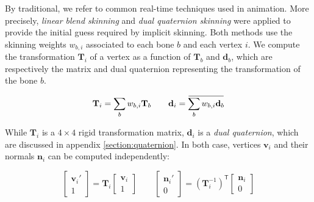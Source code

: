 \documentclass[a4paper,10pt]{article}
\newcommand{\overbar}[1]{\mkern 1.5mu\overline{\mkern-1.5mu#1\mkern-1.5mu}\mkern 1.5mu}
\begin{document}
\begin{multicols}{2}
By traditional, we refer to common real-time techniques used in animation.
More precisely, \emph{linear blend skinning} and \emph{dual quaternion skinning} \cite{Kavan:2008} were applied to provide the initial guess required by implicit skinning.
Both methods use the skinning weights $w_{b,i}$ associated to each bone $b$ and each vertex $i$.
We compute the transformation $\mathbf{T}_i$ of a vertex as a function of $\mathbf{T}_b$ and $\mathbf{d}_b$, which are respectively the matrix and dual quaternion representing the transformation of the bone $b$.

\begin{equation*}
\mathbf{T}_i = \sum_b w_{b,i} \mathbf{T}_b
\qquad
\mathbf{d}_i = \overbar{\sum_b w_{b,i} \mathbf{d}_b}
\end{equation*}

While $\mathbf{T}_i$ is a $4\times 4$ rigid transformation matrix, $\mathbf{d}_i$ is a \emph{dual quaternion}, which are discussed in appendix \ref{section:quaternion}.
In both case, vertices $\mathbf{v}_i$ and their normals $\mathbf{n}_i$ can be computed independently:

\begin{equation*}
\begin{bmatrix}\mathbf{v}_i' \\ 1 \end{bmatrix} = \mathbf{T}_i \begin{bmatrix} \mathbf{v}_i \\ 1 \end{bmatrix}
\qquad
\begin{bmatrix}\mathbf{n}_i' \\ 0 \end{bmatrix} = \left(\mathbf{T}_i^{-1}\right)^{\mathsf{T}} \begin{bmatrix} \mathbf{n}_i \\ 0 \end{bmatrix}
\end{equation*}


\end{multicols}
\end{document}
